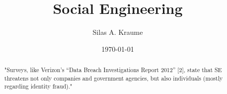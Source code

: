\documentclass{report}
\begin{document}
\title{\Huge{Social Engineering}}
\author{Silas A. Kraume}
\date{\today}

\maketitle

\tableofcontents

\begin{abstract}
    "Surveys, like Verizon's “Data Breach Investigations Report 2012” [2], state that SE threatens not only companies and government agencies, but also individuals (mostly regarding identity fraud)."\cite{7_mdpi}
\end{abstract}










\end{document}
